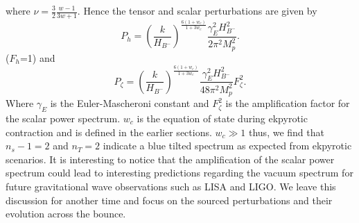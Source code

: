 \documentclass[12pt,a4paper]{article}
\numberwithin{equation}{section}
\numberwithin{equation}{section}
\begin{document}
where $\nu = \frac{3}{2} \frac{w-1}{3w+1}$.
Hence the tensor and scalar perturbations are given by 
\begin{equation}
    P_{h} = \left(\frac{k}{H_{B^-}} \right)^{\frac{6(1+w_c)}{1+3w_c}} \frac{\gamma_{E}^2 H_{B^-}^2}{2 \pi^2 M_p^2}. 
\end{equation}
($F_{h}$=1) and
\begin{equation}
    P_{\zeta} = \left(\frac{k}{H_{B^-}} \right)^{\frac{6(1+w_c)}{1+3w_c}}  \frac{\gamma_{E}^2 H_{B^-}^2}{48 \pi^2 M_p^2} F_{\zeta}^2. 
    \label{eq:nvacs}
\end{equation}
 Where $\gamma_{E}$ is the Euler-Mascheroni constant and $ F_{\zeta}^2$ is the amplification factor for the scalar power spectrum. $w_c$ is the equation of state during ekpyrotic contraction and is defined in the earlier sections. $w_c\gg1$ thus, we find that $n_s-1=2$ and $n_T=2$ indicate a blue tilted spectrum as expected from ekpyrotic scenarios.  It is interesting to notice that the amplification of the scalar power spectrum could lead to interesting predictions regarding the vacuum spectrum for future gravitational wave observations such as LISA and LIGO. We leave this discussion for another time and focus on the sourced perturbations and their evolution across the bounce.
\end{document}
